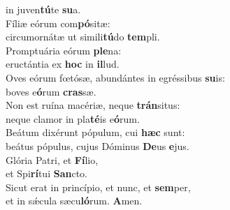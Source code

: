 \oddverse in juven\textbf{tú}te \textbf{su}a.\\
\evenverse Fíliæ eórum com\textbf{pó}sitæ:~\*\\
\evenverse circumornátæ ut simili\textbf{tú}do \textbf{tem}pli.\\
\oddverse Promptuária eórum \textbf{ple}na:~\*\\
\oddverse eructántia ex \textbf{hoc} in \textbf{il}lud.\\
\evenverse Oves eórum fœtósæ, abundántes in egréssibus \textbf{su}is:~\*\\
\evenverse boves e\textbf{ó}rum \textbf{cras}sæ.\\
\oddverse Non est ruína macériæ, neque \textbf{trán}situs:~\*\\
\oddverse neque clamor in pla\textbf{té}is e\textbf{ó}rum.\\
\evenverse Beátum dixérunt pópulum, cui \textbf{hæc} sunt:~\*\\
\evenverse beátus pópulus, cujus Dóminus \textbf{De}us \textbf{e}jus.\\
\oddverse Glória Patri, et \textbf{Fí}lio,~\*\\
\oddverse et Spi\textbf{rí}tui \textbf{San}cto.\\
\evenverse Sicut erat in princípio, et nunc, et \textbf{sem}per,~\*\\
\evenverse et in sǽcula sæcu\textbf{ló}rum. \textbf{A}men.\\
